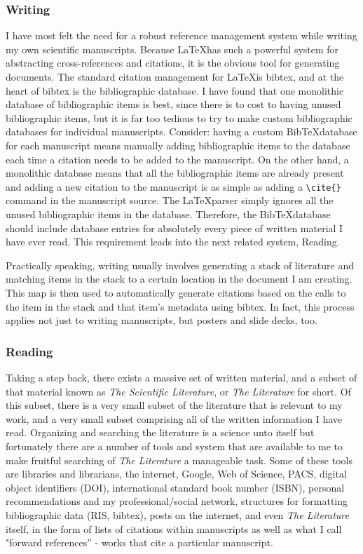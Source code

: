 \documentclass[letterpaper,12pt]{article}
\begin{document}
\subsubsection{Writing}
I have most felt the need for a robust reference management system while writing my own scientific manuscripts. Because \LaTeX has such a powerful system for abstracting cross-references and citations, it is the obvious tool for generating documents. The standard citation management for \LaTeX is bibtex, and at the heart of bibtex is the bibliographic database. I have found that one monolithic database of bibliographic items is best, since there is to cost to having unused bibliographic items, but it is far too tedious to try to make custom bibliographic databases for individual manuscripts. Consider: having a custom Bib\TeX database for each manuscript means manually adding bibliographic items to the database each time a citation needs to be added to the manuscript. On the other hand, a monolithic database means that all the bibliographic items are already present and adding a new citation to the manuscript is as simple as adding a \verb|\cite{}| command in the manuscript source. The \LaTeX parser simply ignores all the unused bibliographic items in the database. Therefore, the Bib\TeX database should include database entries for absolutely every piece of written material I have ever read. This requirement leads into the next related system, Reading.

Practically speaking, writing usually involves generating a stack of literature and matching items in the stack to a certain location in the document I am creating. This map is then used to automatically generate citations based on the calls to the item in the stack and that item's metadata using bibtex. In fact, this process applies not just to writing manuscripts, but posters and slide decks, too.


\subsubsection{Reading}
Taking a step back, there exists a massive set of written material, and a subset of that material known as \emph{The Scientific Literature}, or \emph{The Literature} for short. Of this subset, there is a very small subset of the literature that is relevant to my work, and a very small subset comprising all of the written information I have read. Organizing and searching the literature is a science unto itself but fortunately there are a number of tools and system that are available to me to make fruitful searching of \emph{The Literature} a manageable task. Some of these tools are libraries and librarians, the internet, Google, Web of Science, PACS, digital object identifiers (DOI), international standard book number (ISBN), personal recommendations and my professional/social network, structures for formatting bibliographic data (RIS, bibtex), posts on the internet, and even \emph{The Literature} itself, in the form of lists of citations within manuscripts as well as what I call "forward references'' - works that cite a particular manuscript.
\end{document}
